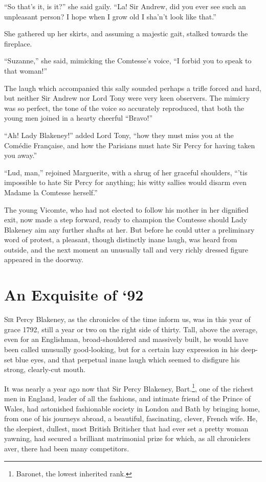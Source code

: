\documentclass[paper=5.5in:8.5in,BCOR=7mm,twoside,DIV=calc,12pt,usegeometry,chapterprefix,endperiod,headings=big]{scrbook}
\begin{document}
\enquote{So that's it, is it?} she said gaily. \enquote{La! Sir Andrew, did you ever see such an unpleasant person? I hope when I grow old I sha'n’t look like that.}

She gathered up her skirts, and assuming a majestic gait, stalked towards the fireplace.

\enquote{Suzanne,} she said, mimicking the Comtesse's voice, \enquote{I forbid you to speak to that woman!}

The laugh which accompanied this sally sounded perhaps a trifle forced and hard, but neither Sir Andrew nor Lord Tony were very keen observers. The mimicry was so perfect, the tone of the voice so accurately reproduced, that both the young men joined in a hearty cheerful \enquote{Bravo!}

\enquote{Ah! Lady Blakeney!} added Lord Tony, \enquote{how they must miss you at the Comédie Française, and how the Parisians must hate Sir Percy for having taken you away.}

\enquote{Lud, man,} rejoined Marguerite, with a shrug of her graceful shoulders, \enquote{’tis impossible to hate Sir Percy for anything; his witty sallies would disarm even Madame la Comtesse herself.}

The young Vicomte, who had not elected to follow his mother in her dignified exit, now made a step forward, ready to champion the Comtesse should Lady Blakeney aim any further shafts at her. But before he could utter a preliminary word of protest, a pleasant, though distinctly inane laugh, was heard from outside, and the next moment an unusually tall and very richly dressed figure appeared in the doorway.

\chapter{An Exquisite of `92}
\lettrine[lines=4]{S}{ir} Percy Blakeney, as the chronicles of the time inform us, was in this year of grace 1792, still a year or two on the right side of thirty. Tall, above the average, even for an Englishman, broad-shouldered and massively built, he would have been called unusually good-looking, but for a certain lazy expression in his deep-set blue eyes, and that perpetual inane laugh which seemed to disfigure his strong, clearly-cut mouth.

It was nearly a year ago now that Sir Percy Blakeney, Bart.\footnote{Baronet, the lowest inherited rank.}, one of the richest men in England, leader of all the fashions, and intimate friend of the Prince of Wales, had astonished fashionable society in London and Bath by bringing home, from one of his journeys abroad, a beautiful, fascinating, clever, French wife. He, the sleepiest, dullest, most British Britisher that had ever set a pretty woman yawning, had secured a brilliant matrimonial prize for which, as all chroniclers aver, there had been many competitors.
\end{document}
